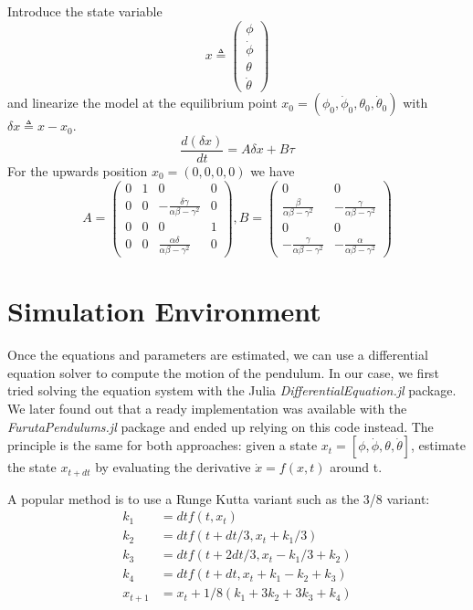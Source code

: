 \documentclass{LTHtwocol} %
\begin{document}
Introduce the state variable 
$$ x \triangleq \begin{pmatrix}
\phi \\ \dot{\phi} \\ \theta \\ \dot{\theta}
\end{pmatrix}$$
and linearize the model at the equilibrium point $x_0 = (\phi_0, \dot{\phi}_0, \theta_0, \dot{\theta}_0)$ with $\delta x \triangleq x- x_0$.
\begin{equation}
    \frac{d(\delta x)}{dt} = A\delta x + B\tau
\label{eq:linequ}
\end{equation}
For the upwards position $x_0 = (0,0,0,0)$ we have $$A = \begin{pmatrix}
0 & 1 & 0 & 0 \\
0 & 0 & -\frac{\delta\gamma}{\alpha\beta - \gamma^2} & 0 \\
0 & 0 & 0 & 1 \\
0 & 0 & \frac{\alpha\delta}{\alpha\beta - \gamma^2} & 0 
\end{pmatrix}, B = \begin{pmatrix}
0 & 0 \\
\frac{\beta}{\alpha\beta - \gamma^2} & -\frac{\gamma}{\alpha\beta - \gamma^2} \\
0 & 0 \\
-\frac{\gamma}{\alpha\beta - \gamma^2} & -\frac{\alpha}{\alpha\beta - \gamma^2}
\end{pmatrix}$$


\section{Simulation Environment}

Once the equations and parameters are estimated, we can use a differential equation solver to compute the motion of the pendulum. In our case, we first tried solving the equation system with the Julia \textit{DifferentialEquation.jl} package\cite{rackauckas2017differentialequations}. We later found out that a ready implementation was available with the \textit{FurutaPendulums.jl} package and ended up relying on this code instead. The principle is the same for both approaches: given a state $x_t = [\phi,\dot\phi,\theta,\dot\theta]$, estimate the state $x_{t+dt}$ by evaluating the derivative $\dot x = f(x,t)$ around t.

A popular method is to use a Runge Kutta variant such as the 3/8 variant:
\begin{align*}
k_1 &= dt f(t, x_t)\\
k_2 &= dt f(t + dt / 3, x_t + k_1 / 3 )\\
k_3 &= dt f(t + 2 dt / 3, x_t - k_1 / 3 + k_2 )\\
k_4 &= dt f(t + dt, x_t + k_1 - k_2 + k_3 )\\
x_{t+1} &= x_t + 1/8 ( k_1 + 3 k_2 + 3 k_3 + k_4 )
\end{align*}
\end{document}
